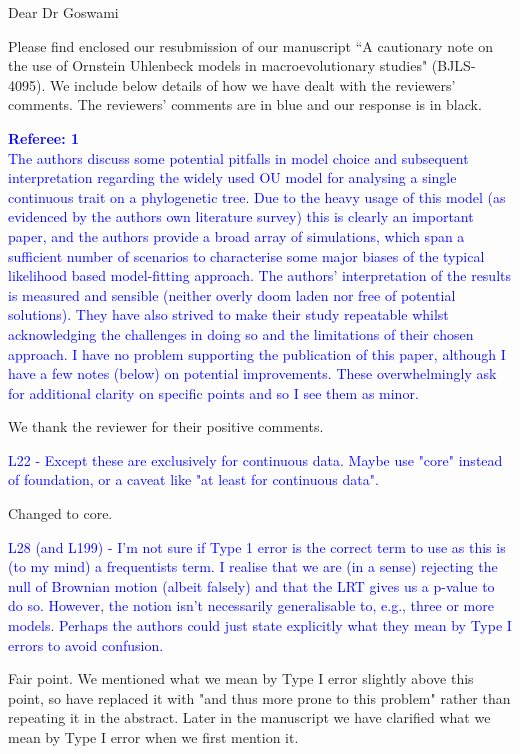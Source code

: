 \documentclass[12pt]{letter}
\begin{document}
\begin{letter}{}
\opening{Dear Dr Goswami}

Please find enclosed our resubmission of our manuscript ``A cautionary note on the use of Ornstein Uhlenbeck models in macroevolutionary studies" (BJLS-4095). We include below details of how we have dealt with the reviewers' comments. The reviewers' comments are in blue and our response is in black.

\textcolor{blue}{\textbf{Referee: 1}\\
The authors discuss some potential pitfalls in model choice and subsequent interpretation regarding the widely used OU model for analysing a single continuous trait on a phylogenetic tree. Due to the heavy usage of this model (as evidenced by the authors own literature survey) this is clearly an important paper, and the authors provide a broad array of simulations, which span a sufficient number of scenarios to characterise some major biases of the typical likelihood based model-fitting approach. The authors' interpretation of the results is measured and sensible (neither overly doom laden nor free of potential solutions). They have also strived to make their study repeatable whilst acknowledging the challenges in doing so and the limitations of their chosen approach. I have no problem supporting the publication of this paper, although I have a few notes (below) on potential improvements. These overwhelmingly ask for additional clarity on specific points and so I see them as minor.}

We thank the reviewer for their positive comments. 

\textcolor{blue}{L22 - Except these are exclusively for continuous data. Maybe use "core" instead of foundation, or a caveat like "at least for continuous data".}

Changed to core.

\textcolor{blue}{L28 (and L199) - I'm not sure if Type 1 error is the correct term to use as this is (to my mind) a frequentists term. I realise that we are (in a sense) rejecting the null of Brownian motion (albeit falsely) and that the LRT gives us a p-value to do so. However, the notion isn't necessarily generalisable to, e.g., three or more models. Perhaps the authors could just state explicitly what they mean by Type I errors to avoid confusion.}

Fair point. We mentioned what we mean by Type I error slightly above this point, so have replaced it with "and thus more prone to this problem" rather than repeating it in the abstract. Later in the manuscript we have clarified what we mean by Type I error when we first mention it.


\end{letter}
\end{document}
